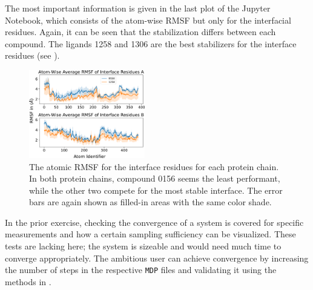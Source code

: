\documentclass[9pt,tutorial]{livecoms}
\begin{document}
The most important information is given in the last plot of the Jupyter Notebook, which consists of the atom-wise RMSF but only for the interfacial residues. Again, it can be seen that the stabilization differs between each compound. The ligands 1258 and 1306 are the best stabilizers for the interface residues (see ).

\begin{figure}[H]
    \centering
    \includegraphics[width=0.45\textwidth]{figures/RMSF_vs_iresids.pdf}
    \caption{The atomic RMSF for the interface residues for each protein chain. In both protein chains, compound 0156 seems the least performant, while the other two compete for the most stable interface. The error bars are again shown as filled-in areas with the same color shade.}
    \label{fig:6_rmsfinterface}
\end{figure}

In the prior exercise, checking the convergence of a system is covered for specific measurements and how a certain sampling sufficiency can be visualized. These tests are lacking here; the system is sizeable and would need much time to converge appropriately. The ambitious user can achieve convergence by increasing the number of steps in the respective \texttt{MDP} files and validating it using the methods in . 
\end{document}
